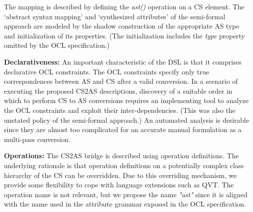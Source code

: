 \documentclass{llncs}
\begin{document}
The mapping is described by defining the \emph{ast()} operation on a CS element. 
The `abstract syntax mapping' and `synthesized attributes' of the semi-formal approach are modeled by the shadow construction of the appropriate AS type and initialization of its properties. (The initialization includes the \emph{type} property omitted by the OCL specification.)



\textbf{Declarativeness:} An important characteristic of the DSL is that it comprises declarative OCL constraints. The OCL constraints specify only true correspondences between AS and CS after a valid conversion. In a scenario of executing the proposed CS2AS descriptions, discovery of a suitable order in which to perform CS to AS conversions requires an implementing tool to analyze the OCL constraints and exploit their inter-dependencies. (This was also the unstated policy of the semi-formal approach.) An automated analysis is desirable since they are almost too complicated for an accurate manual formulation as a multi-pass conversion.

\textbf{Operations:} The CS2AS bridge is described using operation definitions. The underlying rationale is that operation definitions on a potentially complex class hierarchy of the CS can be overridden. Due to this overriding mechanism, we provide some flexibility to cope with language extensions such as QVT. The operation name is not relevant, but we propose the name \emph{"ast"} since it is aligned with the name used in the attribute grammar exposed in the OCL specification.
\end{document}
